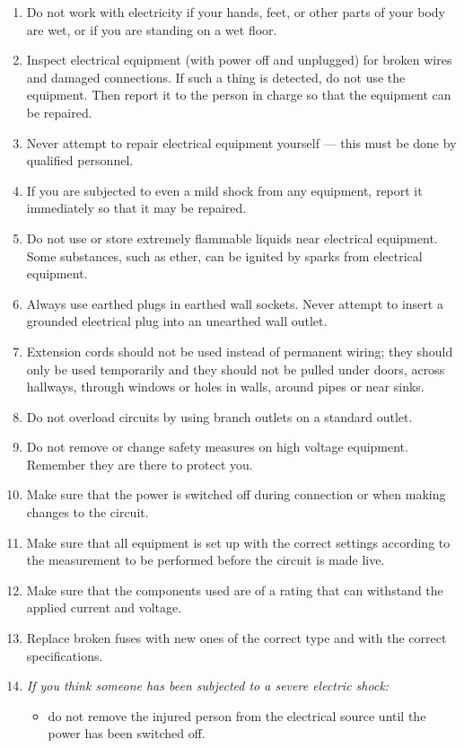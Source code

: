 \documentclass[../Elmag-labhefte-2022.tex]{subfiles}
\begin{document}
\begin{enumerate}
    \item Do not work with electricity if your hands, feet, or other parts of your body are wet, or if you are standing on a wet floor.
    \item Inspect electrical equipment (with power off and unplugged) for broken wires and damaged connections. If such a thing is detected, do not use the equipment. Then report it to the person in charge so that the equipment can be repaired.
    \item Never attempt to repair electrical equipment yourself --- this must be done by qualified personnel.
    \item If you are subjected to even a mild shock from any equipment, report it immediately so that it may be repaired.
    \item Do not use or store extremely flammable liquids near electrical equipment. Some substances, such as ether, can be ignited by sparks from electrical equipment.
    \item Always use earthed plugs in earthed wall sockets. Never attempt to insert a grounded electrical plug into an unearthed wall outlet.
    \item Extension cords should not be used instead of permanent wiring; they should only be used temporarily and they should not be pulled under doors, across hallways, through windows or holes in walls, around pipes or near sinks.
    \item Do not overload circuits by using branch outlets on a standard outlet.
    \item Do not remove or change safety measures on high voltage equipment. Remember they are there to protect you.
    \item Make sure that the power is switched off during connection or when making changes to the circuit.
    \item Make sure that all equipment is set up with the correct settings according to the measurement to be performed before the circuit is made live.
    \item Make sure that the components used are of a rating that can withstand the applied current and voltage.
    \item Replace broken fuses with new ones of the correct type and with the correct specifications.
    \item \emph{If you think someone has been subjected to a severe electric shock:}
    \begin{itemize}
        \item do not remove the injured person from the electrical source until the power has been switched off.

\end{itemize}
\end{enumerate}
\end{document}
